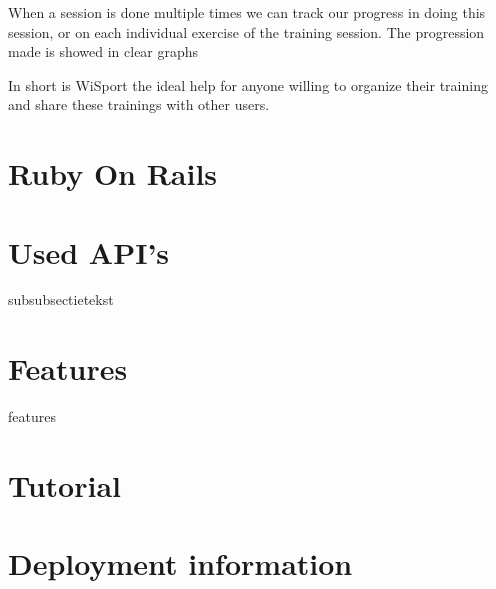 \documentclass[11pt,a4paper]{scrartcl}
\begin{document}
When a session is done multiple times we can track our progress in doing this session, or on each individual exercise of the training session. The progression made is 
showed in clear graphs

In short is WiSport the ideal help for anyone willing to organize their training and share these trainings with other users.

\section{Ruby On Rails}
\section{Used API's}
subsubsectietekst
\section{Features}
features
\section{Tutorial}
\section{Deployment information}


\newpage        %

\newpage
\printindex                             %
\end{document}
